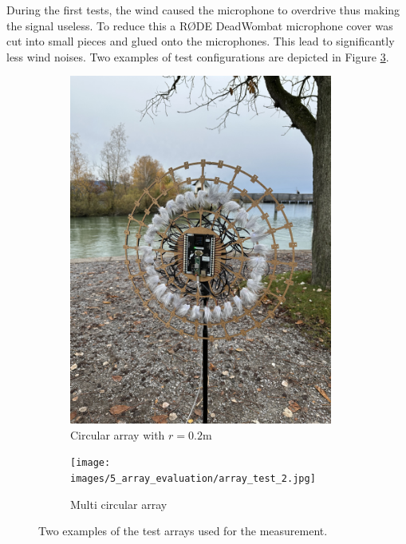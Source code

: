 During the first tests, the wind caused the microphone to overdrive
thus making the signal useless.
To reduce this a RØDE DeadWombat microphone cover was cut into small pieces
and glued onto the microphones.
This lead to significantly less wind noises.
Two examples of test configurations are depicted in Figure \ref*{fig:testSetup}.
\begin{figure}[h]
	\centering
	\begin{subfigure}[b]{0.49\textwidth}
		\centering
		\includegraphics[width=0.95\textwidth]{images/5_array_evaluation/array_test_1.jpg}
		\caption{Circular array with $r=0.2$m}
		\label{fig:array_test_1}
	\end{subfigure}
	\begin{subfigure}[b]{0.49\textwidth}
		\centering
		\texttt{[image: images/5\_array\_evaluation/array\_test\_2.jpg]}
		\caption{Multi circular array}
		\label{fig:array_test_2}
	\end{subfigure}
	\caption{Two examples of the test arrays used for the measurement.}
	\label{fig:testSetup}
\end{figure}
